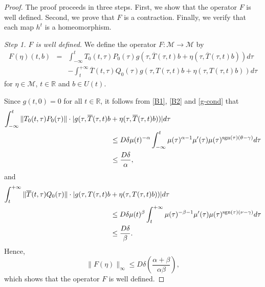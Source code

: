 \documentclass[9pt]{amsart}
\numberwithin{equation}{section}
\numberwithin{lemma}{section}
\begin{document}
\begin{proof}
The proof proceeds in three steps. First, we show that the operator $F$ is well defined. Second, we prove that $F$ is a contraction. Finally, we verify that each map $h^t$ is a homeomorphism.

\textit{Step 1. $F$ is well defined.} We define the operator $F\colon\mathcal{M}\to \mathcal{M}$ by
    \begin{equation}\label{F}
        \begin{array}{rcl}
            F(\eta)(t,b) & = & \displaystyle\int_{-\infty}^{t} T_0(t,\tau)P_0(\tau)g(\tau,\overline{T}(\tau,t)b+\eta(\tau,\overline{T}(\tau,t)b))d\tau \\
             & & -\displaystyle\int_{t}^{+\infty}\overline{T}(t,\tau)Q_0(\tau)g(\tau, T(\tau,t)b+\eta(\tau,T(\tau,t)b))d\tau
        \end{array}
    \end{equation}
    for $\eta\in\mathcal{M}$, $t\in\mathbb{R}$ and $b\in U(t)$.

    Since $g(t,0)=0$ for all $t\in \mathbb{R}$, it follows from \eqref{B1}, \eqref{B2} and \eqref{g-cond} that
\begin{align*}
        \int_{-\infty}^{t}\|T_0(t,\tau)P_0(\tau)\|\cdot|g(\tau,\overline{T}(\tau,t)b&+\eta(\tau,\overline{T}(\tau,t)b))|d\tau\\
        &\leq D\delta\mu(t)^{-\alpha}\int_{-\infty}^{t} \mu(\tau)^{\alpha-1}\mu'(\tau)\mu(\tau)^{\textnormal{sgn}(\tau)(\theta-\gamma)}d\tau\\
        &\leq \frac{D\delta}{\alpha},
    \end{align*}
    and
\begin{align*}
\int_{t}^{+\infty}\|\overline{T}(t,\tau)Q_0(\tau)\|\cdot|g(\tau,T(\tau,t)b&+\eta(\tau,T(\tau,t)b))|d\tau\\
        &\leq D\delta\mu(t)^{\beta}\int_{t}^{+\infty} \mu(\tau)^{-\beta-1}\mu'(\tau)\mu(\tau)^{\textnormal{sgn}(\tau)(\nu-\gamma)}d\tau\\
        &\leq \frac{D\delta}{\beta}.
    \end{align*}
    Hence,
    \begin{equation*}
\|F(\eta)\|_{\infty}\leq D\delta\left(\frac{\alpha+\beta}{\alpha\beta}\right),
    \end{equation*}
    which shows that the operator $F$ is well defined. 


\end{proof}
\end{document}
